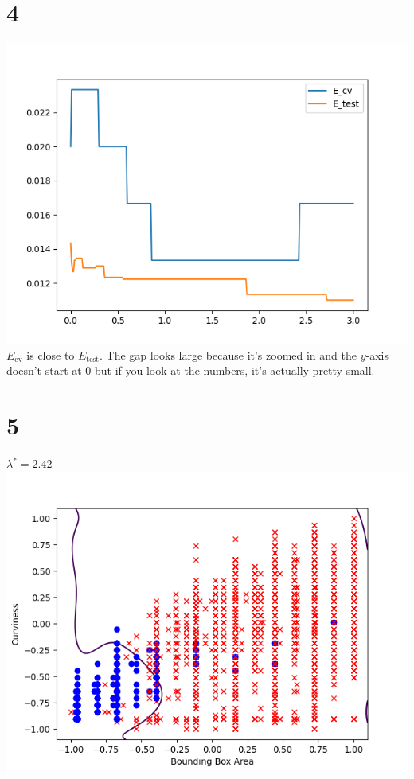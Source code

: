 \documentclass{article}
\begin{document}
	\section*{4}
		\includegraphics[scale=0.8]{4.png}\\
		$E_\text{cv}$ is close to $E_\text{test}$. The gap looks large because it's zoomed in and the $y$-axis doesn't start at 0 but if you look at the numbers, it's actually pretty small.
		
	\section*{5}
		$\lambda^* = 2.42$\\
		\includegraphics[scale=0.8]{5.png}
		
\end{document}
